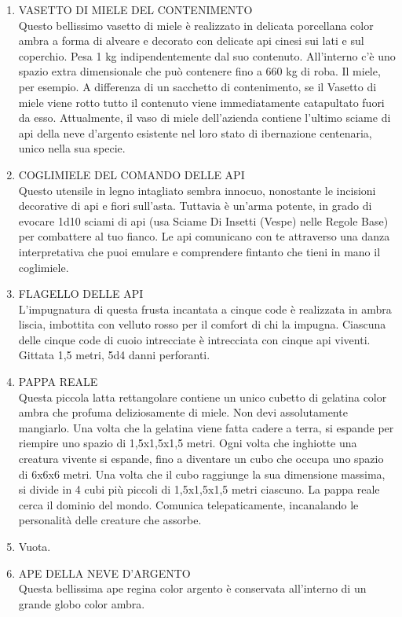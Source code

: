 \documentclass{article}
\begin{document}
\begin{enumerate}
    \item VASETTO DI MIELE DEL CONTENIMENTO \\
    Questo bellissimo vasetto di miele è realizzato in delicata porcellana color ambra a forma di alveare e decorato con delicate api cinesi sui lati e sul coperchio. Pesa 1 kg indipendentemente dal suo contenuto. All'interno c'è uno spazio extra dimensionale che può contenere fino a 660 kg di roba. Il miele, per esempio. A differenza di un sacchetto di contenimento, se il Vasetto di miele viene rotto tutto il contenuto viene immediatamente catapultato fuori da esso. Attualmente, il vaso di miele dell'azienda contiene l'ultimo sciame di api della neve d'argento esistente nel loro stato di ibernazione centenaria, unico nella sua specie.
    
    \item COGLIMIELE DEL COMANDO DELLE API \\
    Questo utensile in legno intagliato sembra innocuo, nonostante le incisioni decorative di api e fiori sull'asta. Tuttavia è un'arma potente, in grado di evocare 1d10 sciami di api (usa Sciame Di Insetti (Vespe) nelle Regole Base) per combattere al tuo fianco. Le api comunicano con te attraverso una danza interpretativa che puoi emulare e comprendere fintanto che tieni in mano il coglimiele.
    
    \item FLAGELLO DELLE API \\
    L'impugnatura di questa frusta incantata a cinque code è realizzata in ambra liscia, imbottita con velluto rosso per il comfort di chi la impugna. Ciascuna delle cinque code di cuoio intrecciate è intrecciata con cinque api viventi. Gittata 1,5 metri, 5d4 danni perforanti.
    
    \item PAPPA REALE \\
    Questa piccola latta rettangolare contiene un unico cubetto di gelatina color ambra che profuma deliziosamente di miele. Non devi assolutamente mangiarlo. Una volta che la gelatina viene fatta cadere a terra, si espande per riempire uno spazio di 1,5x1,5x1,5 metri. Ogni volta che inghiotte una creatura vivente si espande, fino a diventare un cubo che occupa uno spazio di 6x6x6 metri. Una volta che il cubo raggiunge la sua dimensione massima, si divide in 4 cubi più piccoli di 1,5x1,5x1,5 metri ciascuno. La pappa reale cerca il dominio del mondo. Comunica telepaticamente, incanalando le personalità delle creature che assorbe.
    
    \item Vuota.
    
    \item APE DELLA NEVE D'ARGENTO \\
    Questa bellissima ape regina color argento è conservata all'interno di un grande globo color ambra.
\end{enumerate}
\end{document}
